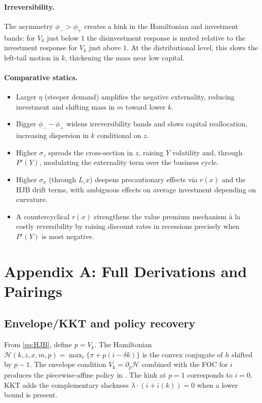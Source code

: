 \documentclass[11pt,letterpaper,oneside]{article}
\numberwithin{equation}{section}
\newcommand{\1}{\mathbf{1}}
\newcommand{\Lx}{L\_x}
\newcommand{\kbar}{\bar\iota}
\begin{document}
\paragraph{Irreversibility.}
The asymmetry $\phi_->\phi_+$ creates a kink in the Hamiltonian and investment bands: for $V_k$ just below $1$ the disinvestment response is muted relative to the investment response for $V_k$ just above $1$. At the distributional level, this slows the left-tail motion in $k$, thickening the mass near low capital.

\paragraph{Comparative statics.}
\begin{itemize}[leftmargin=1.25em]
\item Larger $\eta$ (steeper demand) amplifies the negative externality, reducing investment and shifting mass in $m$ toward lower $k$.
\item Bigger $\phi_- - \phi_+$ widens irreversibility bands and slows capital reallocation, increasing dispersion in $k$ conditional on $z$.
\item Higher $\sigma_z$ spreads the cross-section in $z$, raising $Y$ volatility and, through $P'(Y)$, modulating the externality term over the business cycle.
\item Higher $\sigma_x$ (through $\Lx$) deepens precautionary effects via $r(x)$ and the HJB drift terms, with ambiguous effects on average investment depending on curvature.
\item A countercyclical $r(x)$ strengthens the value premium mechanism à la costly reversibility by raising discount rates in recessions precisely when $P'(Y)$ is most negative.
\end{itemize}

\appendix
\section{Appendix A: Full Derivations and Pairings}\label{app:derivations}

\subsection{Envelope/KKT and policy recovery}
From \eqref{eq:HJB}, define $p=V_k$. The Hamiltonian
$\mathcal{H}(k,z,x,m,p)=\max_i\{\pi+p(i-\delta k)\}$
is the convex conjugate of $h$ shifted by $p-1$. The envelope condition $V_k=\partial_p \mathcal{H}$ combined with the FOC for $i$ produces the piecewise-affine policy in . The kink at $p=1$ corresponds to $i=0$. KKT adds the complementary slackness $\lambda\cdot(i+\kbar(k))=0$ when a lower bound is present.
\end{document}
